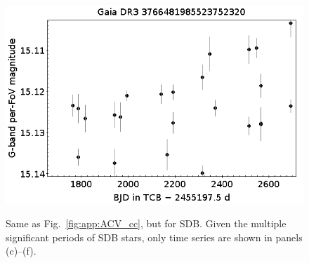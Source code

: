 \documentclass[longauth]{aa}
\begin{document}
\begin{appendix}
\begin{figure}
\hspace{2mm}
 \includegraphics[width=0.45\hsize]{figures/appendix/SDB-0-0p0017.png} \\
\vspace{4mm}
 \caption{Same as Fig.~\ref{fig:app:ACV_cc}, but for SDB. Given the multiple significant periods of SDB stars, only time series are shown in panels (c)--(f).}
 \label{fig:app:SDB_cc}
\end{figure}




\end{appendix}
\end{document}
